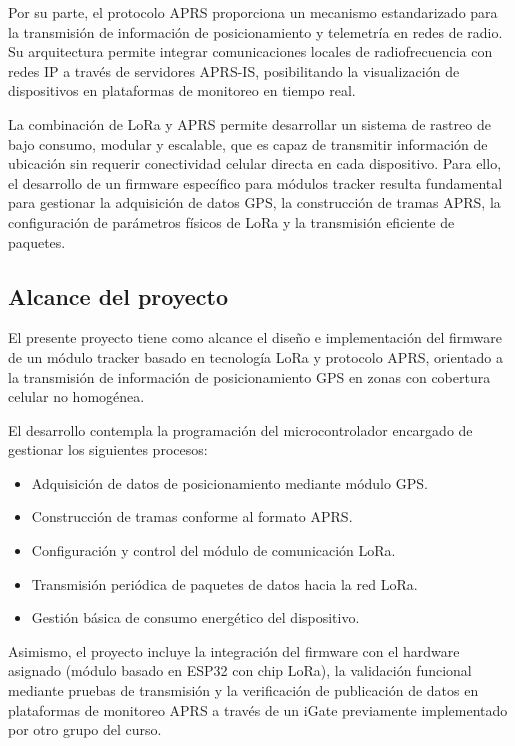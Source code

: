 \documentclass[conference]{IEEEtran}
\begin{document}
Por su parte, el protocolo APRS proporciona un mecanismo estandarizado para la transmisión de información de posicionamiento y telemetría en redes de radio. Su arquitectura permite integrar comunicaciones locales de radiofrecuencia con redes IP a través de servidores APRS-IS, posibilitando la visualización de dispositivos en plataformas de monitoreo en tiempo real.

La combinación de LoRa y APRS permite desarrollar un sistema de rastreo de bajo consumo, modular y escalable, que es capaz de transmitir información de ubicación sin requerir conectividad celular directa en cada dispositivo. Para ello, el desarrollo de un firmware específico para módulos tracker resulta fundamental para gestionar la adquisición de datos GPS, la construcción de tramas APRS, la configuración de parámetros físicos de LoRa y la transmisión eficiente de paquetes.

\subsection{Alcance del proyecto}

El presente proyecto tiene como alcance el diseño e implementación del firmware de un módulo tracker basado en tecnología LoRa y protocolo APRS, orientado a la transmisión de información de posicionamiento GPS en zonas con cobertura celular no homogénea.

El desarrollo contempla la programación del microcontrolador encargado de gestionar los siguientes procesos:

\begin{itemize}
  \item Adquisición de datos de posicionamiento mediante módulo GPS.
  \item Construcción de tramas conforme al formato APRS.
  \item Configuración y control del módulo de comunicación LoRa.
  \item Transmisión periódica de paquetes de datos hacia la red LoRa.
  \item Gestión básica de consumo energético del dispositivo.
\end{itemize}

Asimismo, el proyecto incluye la integración del firmware con el hardware asignado (módulo basado en ESP32 con chip LoRa), la validación funcional mediante pruebas de transmisión y la verificación de publicación de datos en plataformas de monitoreo APRS a través de un iGate previamente implementado por otro grupo del curso.
\end{document}
